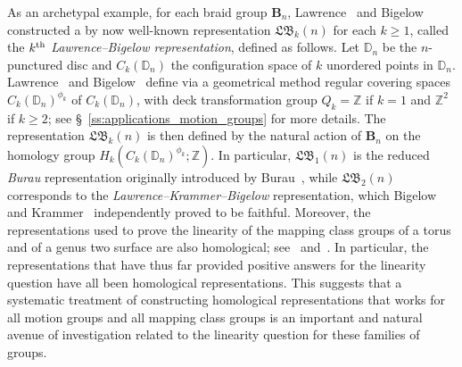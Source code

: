 \documentclass[AHL,Unicode,published]{cedram}
\newcommand{\B}{\ensuremath{\mathbf{B}}}
\newcommand{\LB}{\mathfrak{LB}}
\newcommand{\bD}{\mathbb{D}}
\newcommand{\bZ}{\mathbb{Z}}
\renewcommand{\geq}{\geqslant}
\begin{document}
As an archetypal example, for each braid group $\B_{n}$, Lawrence~\cite{Lawrence1} and Bigelow \cite{bigelow2001braid} constructed a by now well-known representation $\LB_{k}(n)$ for each $k\geq 1$, called the $k^{\rm th}$ \emph{Lawrence--Bigelow representation}, defined as follows. Let $\bD_{n}$ be the $n$-punctured disc and $C_{k}(\bD_{n})$ the configuration space of $k$ unordered points in $\bD_{n}$. Lawrence~\cite[\S~2]{Lawrence1} and Bigelow~\cite[\S~1.2]{bigelow2001braid} define via a geometrical method regular covering spaces $C_{k}(\bD_{n})^{\phi_{k}}$ of $C_{k}(\bD_{n})$, with deck transformation group $Q_{k}=\bZ$ if $k=1$ and $\bZ^{2}$ if $k\geq2$; see \S~\ref{ss:applications_motion_groups} for more details. The representation $\LB_{k}(n)$ is then defined by the natural action of $\B_{n}$ on the homology group $H_{k}(C_{k}(\bD_{n})^{\phi_{k}};\bZ)$. In particular, $\LB_{1}(n)$ is the reduced \emph{Burau} representation originally introduced by Burau~\cite{burau}, while $\LB_{2}(n)$ corresponds to the \emph{Lawrence--Krammer--Bigelow} representation, which Bigelow~\cite{bigelow2001braid} and Krammer~\cite{KrammerLK} independently proved to be faithful. Moreover, the representations used to prove the linearity of the mapping class groups of a torus and of a genus two surface are also homological; see~\cite[Th.~2.5]{farbmargalit} and~\cite[\S~3]{BigelowBudney}. In particular, the representations that have thus far provided positive answers for the linearity question have all been homological representations. This suggests that a systematic treatment of constructing homological representations that works for all motion groups and all mapping class groups is an important and natural avenue of investigation related to the linearity question for these families of groups.
\end{document}
